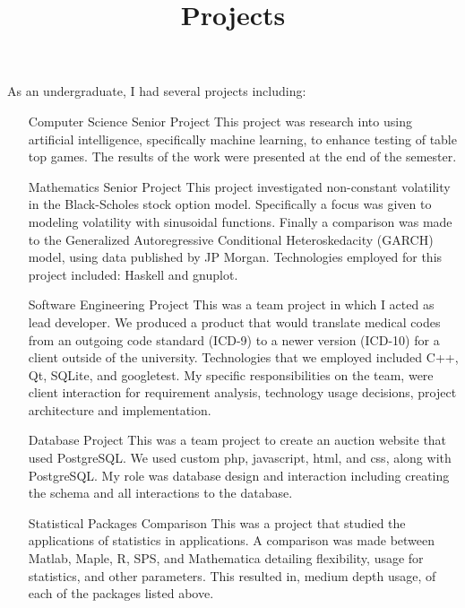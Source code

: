 \documentclass[margintitle,line]{res}
\begin{document}
\begin{resume}
\title{Projects}
\begin{position}
As an undergraduate, I had several projects including:
\begin{itemize}
\item [Computer Science Senior Project] This project was research into using artificial intelligence, specifically machine learning, to enhance testing of table top games. The results of the work were presented at the end of the semester.

\item[Mathematics Senior Project] This project investigated non-constant volatility in the Black-Scholes stock option model. Specifically a focus was given to modeling volatility with sinusoidal functions. Finally a comparison was made to the Generalized Autoregressive Conditional Heteroskedacity (GARCH) model, using data published by JP Morgan. Technologies employed for this project included: Haskell and gnuplot.

\item[Software Engineering Project] This was a team project in which I acted as lead developer. We produced a product that would translate medical codes from an outgoing code standard (ICD-9) to a newer version (ICD-10) for a client outside of the university. Technologies that we employed included C++, Qt, SQLite, and googletest. My specific responsibilities on the team, were client interaction for requirement analysis, technology usage decisions, project architecture and implementation.

\item[Database Project] This was a team project to create an auction website that used PostgreSQL. We used custom php, javascript, html, and css, along with PostgreSQL. My role was database design and interaction including creating the schema and all interactions to the database.

\item[Statistical Packages Comparison] This was a project that studied the applications of statistics in applications. A comparison was made between Matlab, Maple, R, SPS, and Mathematica detailing flexibility, usage for statistics, and other parameters. This resulted in, medium depth usage, of each of the packages listed above.
\end{itemize}
\end{position}


\end{resume}
\end{document}
